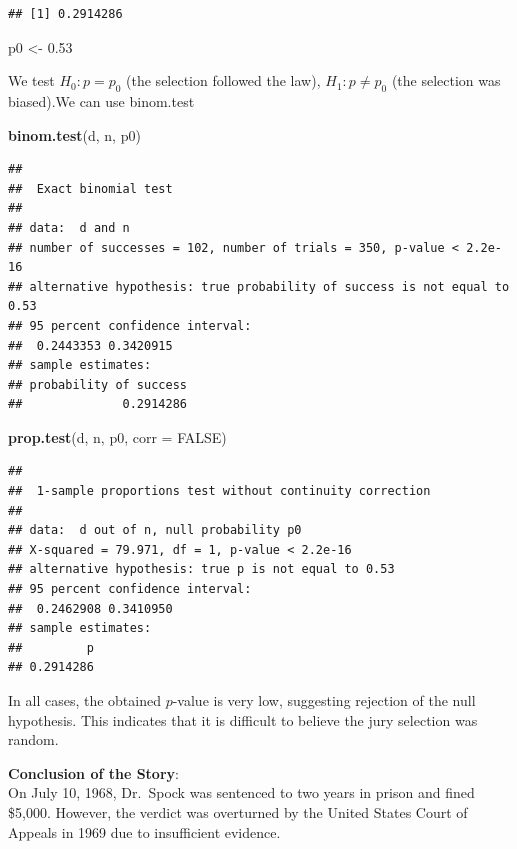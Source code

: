 \documentclass[
]{article}
\newenvironment{Shaded}{\begin{snugshade}}{\end{snugshade}}
\newcommand{\AttributeTok}[1]{\textcolor[rgb]{0.13,0.29,0.53}{#1}}
\newcommand{\ConstantTok}[1]{\textcolor[rgb]{0.56,0.35,0.01}{#1}}
\newcommand{\FloatTok}[1]{\textcolor[rgb]{0.00,0.00,0.81}{#1}}
\newcommand{\FunctionTok}[1]{\textcolor[rgb]{0.13,0.29,0.53}{\textbf{#1}}}
\newcommand{\NormalTok}[1]{#1}
\newcommand{\OtherTok}[1]{\textcolor[rgb]{0.56,0.35,0.01}{#1}}
\begin{document}
\begin{verbatim}
## [1] 0.2914286
\end{verbatim}

\begin{Shaded}
\begin{Highlighting}[]
\NormalTok{p0 }\OtherTok{\textless{}{-}} \FloatTok{0.53}
\end{Highlighting}
\end{Shaded}

We test \(H_0: p = p_0\) (the selection followed the law),
\(H_1: p\not=p_0\) (the selection was biased).We can use binom.test

\begin{Shaded}
\begin{Highlighting}[]
\FunctionTok{binom.test}\NormalTok{(d, n, p0)}
\end{Highlighting}
\end{Shaded}

\begin{verbatim}
## 
##  Exact binomial test
## 
## data:  d and n
## number of successes = 102, number of trials = 350, p-value < 2.2e-16
## alternative hypothesis: true probability of success is not equal to 0.53
## 95 percent confidence interval:
##  0.2443353 0.3420915
## sample estimates:
## probability of success 
##              0.2914286
\end{verbatim}

\begin{Shaded}
\begin{Highlighting}[]
\FunctionTok{prop.test}\NormalTok{(d, n, p0, }\AttributeTok{corr =} \ConstantTok{FALSE}\NormalTok{)}
\end{Highlighting}
\end{Shaded}

\begin{verbatim}
## 
##  1-sample proportions test without continuity correction
## 
## data:  d out of n, null probability p0
## X-squared = 79.971, df = 1, p-value < 2.2e-16
## alternative hypothesis: true p is not equal to 0.53
## 95 percent confidence interval:
##  0.2462908 0.3410950
## sample estimates:
##         p 
## 0.2914286
\end{verbatim}

In all cases, the obtained \(p\)-value is very low, suggesting rejection
of the null hypothesis. This indicates that it is difficult to believe
the jury selection was random.

\textbf{Conclusion of the Story}:\\
On July 10, 1968, Dr.~Spock was sentenced to two years in prison and
fined \$5,000. However, the verdict was overturned by the United States
Court of Appeals in 1969 due to insufficient evidence.
\end{document}
